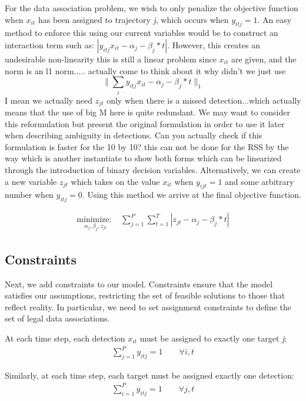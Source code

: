 \documentclass[journal]{IEEEtran}
\begin{document}
For the data association problem, we wish to only penalize the objective function when $x_{it}$ has been assigned to trajectory \textit{j}, which occurs when $y_{itj}=1$. An easy method to enforce this using our current variables would be to construct an interaction term such as: $|y_{itj}x_{it} - \alpha_{j} - \beta_{j}*t|$. However, this creates an undesirable non-linearity {\color{red} this is still a linear problem since $x_{it}$ are given, and the norm is an l1 norm..... actually come to think about it why didn't we just use $$\|\sum_{i}y_{itj}x_{it} - \alpha_{j} - \beta_{j}*t\|_1$$ I mean we actually need $z_{jt}$ only when there is a missed detection...which actually means that the use of big M here is quite redundant. We may want to consider this reformulation but present the original formulation in order to use it later when describing ambiguity in detections. Can you actually check if this formulation is faster for the 10 by 10? this can not be done for the RSS by the way which is another instantiate to show both forms} which can be linearized through the introduction of binary decision variables. Alternatively, we can create a new variable $z_{jt}$ which takes on the value $x_{it}$ when $y_{ijt}=1$ and some arbitrary number when $y_{itj}=0$. Using this method we arrive at the final objective function. 

\begin{align}
\underset{\alpha_{j}, \beta_{j}, z_{jt}}{\text{minimize: }} & \sum_{j=1}^{P} \sum_{t=1}^{T} |z_{jt} - \alpha_{j} - \beta_{j}*t| 
\end{align}

\subsection{Constraints}
Next, we add constraints to our model. Constraints ensure that the model satisfies our assumptions, restricting the set of feasible solutions to those that reflect reality. In particular, we need to set assignment constraints to define the set of legal data associations.

At each time step, each detection $x_{it}$ must be assigned to exactly one target \textit{j}:
\begin{align}
\sum_{j=1}^{P} y_{itj} = 1 \qquad \forall i,t
\end{align}

Similarly, at each time step, each target must be assigned exactly one detection:
\begin{align}
\sum_{i=1}^{P} y_{itj} = 1 \qquad \forall j,t
\end{align}
\end{document}
